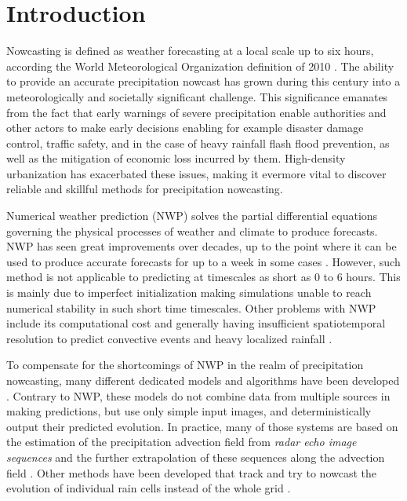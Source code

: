 \chapter{Introduction}
\label{chapter:intro}


Nowcasting is defined as weather forecasting at a local scale up to six hours, according the World Meteorological Organization definition of 2010 \cite{schmid2019nowcasting}. The ability to provide an accurate precipitation nowcast has grown during this century into a meteorologically and societally significant challenge. This significance emanates from the fact that early warnings of severe precipitation enable authorities and other actors to make early decisions enabling for example disaster damage control, traffic safety, and in the case of heavy rainfall flash flood prevention, as well as the mitigation of economic loss incurred by them. High-density urbanization has exacerbated these issues, making it evermore vital to discover reliable and skillful methods for precipitation nowcasting. 

Numerical weather prediction (NWP) solves the partial differential equations governing the physical processes of weather and climate to produce forecasts. NWP has seen great improvements over decades, up to the point where it can be used to produce accurate forecasts for up to a week in some cases \cite{bauer_quiet_2015}. However, such method is not applicable to predicting at timescales as short as 0 to 6 hours. This is mainly due to imperfect initialization making simulations unable to reach numerical stability in such short time timescales. 
Other problems with NWP include its computational cost and generally having insufficient spatiotemporal resolution to predict convective events and heavy localized rainfall \cite{schultz_can_2021}. 



To compensate for the shortcomings of NWP in the realm of precipitation nowcasting, many different dedicated models and algorithms have been developed \cite{prudden_review_2020}. Contrary to NWP, these models do not combine data from multiple sources in making predictions, but use only simple input images, and deterministically output their predicted evolution. In practice, many of those systems are based on the estimation of the precipitation advection field from \textit{radar echo image sequences} and the further extrapolation of these sequences along the advection field \cite{prudden_review_2020, rinehart_three-dimensional_1978}. Other methods  have been developed that track and try to nowcast the evolution of individual rain cells instead of the whole grid \cite{prudden_review_2020, dixon1993titan}. 

